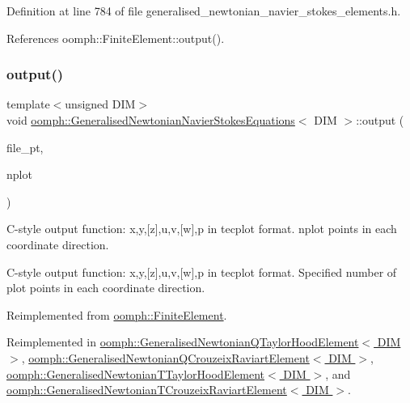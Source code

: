 Definition at line 784 of file generalised\+\_\+newtonian\+\_\+navier\+\_\+stokes\+\_\+elements.\+h.



References oomph\+::\+Finite\+Element\+::output().

\mbox{\label{classoomph_1_1GeneralisedNewtonianNavierStokesEquations_a4cea0e2de7ce23a994bda1ee87222d21}} 
\subsubsection{\texorpdfstring{output()}{output()}\hspace{0.1cm}{\footnotesize\ttfamily [4/4]}}
{\footnotesize\ttfamily template$<$unsigned D\+IM$>$ \\
void \hyperlink{classoomph_1_1GeneralisedNewtonianNavierStokesEquations}{oomph\+::\+Generalised\+Newtonian\+Navier\+Stokes\+Equations}$<$ D\+IM $>$\+::output (\begin{DoxyParamCaption}\item[{F\+I\+LE $\ast$}]{file\+\_\+pt,  }\item[{const unsigned \&}]{nplot }\end{DoxyParamCaption})\hspace{0.3cm}{\ttfamily [virtual]}}



C-\/style output function\+: x,y,\mbox{[}z\mbox{]},u,v,\mbox{[}w\mbox{]},p in tecplot format. nplot points in each coordinate direction. 

C-\/style output function\+: x,y,\mbox{[}z\mbox{]},u,v,\mbox{[}w\mbox{]},p in tecplot format. Specified number of plot points in each coordinate direction. 

Reimplemented from \hyperlink{classoomph_1_1FiniteElement_adfaee690bb0608f03320eeb9d110d48c}{oomph\+::\+Finite\+Element}.



Reimplemented in \hyperlink{classoomph_1_1GeneralisedNewtonianQTaylorHoodElement_a81288f63a98b7bf60ba3fbd31d1befa7}{oomph\+::\+Generalised\+Newtonian\+Q\+Taylor\+Hood\+Element$<$ D\+I\+M $>$}, \hyperlink{classoomph_1_1GeneralisedNewtonianQCrouzeixRaviartElement_aa6119cf023b202657222a8d6ee86612c}{oomph\+::\+Generalised\+Newtonian\+Q\+Crouzeix\+Raviart\+Element$<$ D\+I\+M $>$}, \hyperlink{classoomph_1_1GeneralisedNewtonianTTaylorHoodElement_acc88cfe3517146492eff605648a22ee3}{oomph\+::\+Generalised\+Newtonian\+T\+Taylor\+Hood\+Element$<$ D\+I\+M $>$}, and \hyperlink{classoomph_1_1GeneralisedNewtonianTCrouzeixRaviartElement_a5cd44245b4ad4ecbf6179be6068d37ea}{oomph\+::\+Generalised\+Newtonian\+T\+Crouzeix\+Raviart\+Element$<$ D\+I\+M $>$}.




